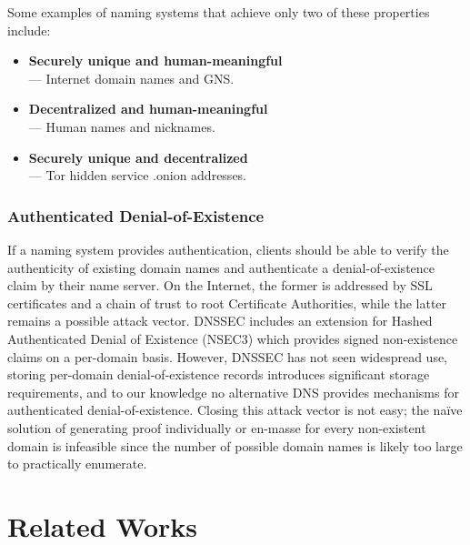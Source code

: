 \documentclass[conference]{IEEEtran}
\begin{document}
Some examples of naming systems that achieve only two of these properties include:

\begin{itemize}
	\item \textbf{Securely unique and human-meaningful} \\ --- Internet domain names and GNS.
	\item \textbf{Decentralized and human-meaningful} \\ --- Human names and nicknames.
	\item \textbf{Securely unique and decentralized} \\ --- Tor hidden service .onion addresses.
\end{itemize}


\subsubsection{Authenticated Denial-of-Existence}
\label{sec:authDenialIntro}

If a naming system provides authentication, clients should be able to verify the authenticity of existing domain names and authenticate a denial-of-existence claim by their name server. On the Internet, the former is addressed by SSL certificates and a chain of trust to root Certificate Authorities, while the latter remains a possible attack vector. DNSSEC includes an extension for Hashed Authenticated Denial of Existence (NSEC3) which provides signed non-existence claims on a per-domain basis. However, DNSSEC has not seen widespread use, storing per-domain denial-of-existence records introduces significant storage requirements, and to our knowledge no alternative DNS provides mechanisms for authenticated denial-of-existence. Closing this attack vector is not easy; the na\"{i}ve solution of generating proof individually or en-masse for every non-existent domain is infeasible since the number of possible domain names is likely too large to practically enumerate.

\section{Related Works}
\label{sec:RelatedWorks}
\end{document}

